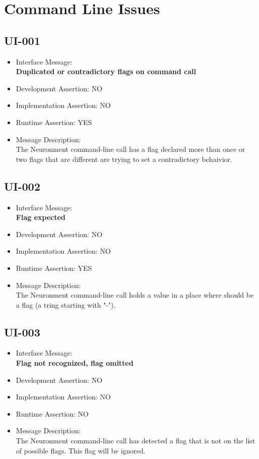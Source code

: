 \section{Command Line Issues}

\subsection{UI-001}
\begin{itemize}
  \item Interface Message:\\[1em]
    \textbf{Duplicated or contradictory flags on command call}
  \item Development Assertion: NO
  \item Implementation Assertion: NO
  \item Runtime Assertion: YES
  \item Message Description:\\[1em]
    The Neuronment command-line call has a flag declared more than once or two flags that are different are trying to set a contradictory behaivior.
\end{itemize}

\subsection{UI-002}
\begin{itemize}
  \item Interface Message:\\[1em]
    \textbf{Flag expected}
  \item Development Assertion: NO
  \item Implementation Assertion: NO
  \item Runtime Assertion: YES
  \item Message Description:\\[1em]
    The Neuronment command-line call holds a value in a place where should be a flag (a tring starting with "-").
\end{itemize}

\subsection{UI-003}
\begin{itemize}
  \item Interface Message:\\[1em]
    \textbf{Flag not recognized, flag omitted}
  \item Development Assertion: NO
  \item Implementation Assertion: NO
  \item Runtime Assertion: NO
  \item Message Description:\\[1em]
    The Neuronment command-line call has detected a flag that is not on the list of possible flags. This flag will be ignored.
\end{itemize}

